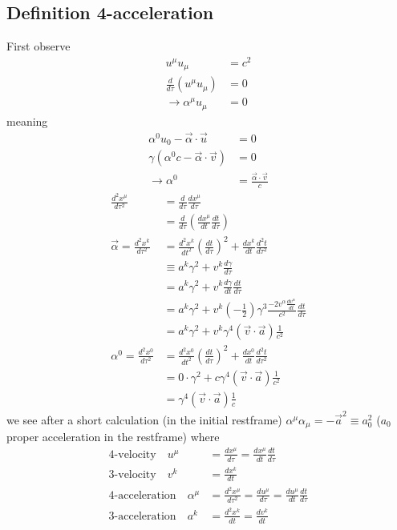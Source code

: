\documentclass[10pt,a4paper]{book}
\theoremstyle{definition}
\begin{document}
\subsection{Definition 4-acceleration}
First observe
\begin{align}
u^\mu u_\mu&=c^2\\
\frac{d}{d\tau}(u^\mu u_\mu)&=0\\
\rightarrow \alpha^\mu u_\mu&=0
\end{align}
meaning
\begin{align}
\alpha^0 u_0-\vec{\alpha}\cdot\vec{u}&=0\\
\gamma(\alpha^0 c-\vec{\alpha}\cdot\vec{v})&=0\\
\rightarrow \alpha^0&=\frac{\vec{\alpha}\cdot\vec{v}}{c}
\end{align}
\begin{align}
\frac{d^2x^\mu}{d\tau^2}
&=\frac{d}{d\tau}\frac{dx^\mu}{d\tau}\\
&=\frac{d}{d\tau}\left(\frac{dx^\mu}{dt}\frac{dt}{d\tau}\right)\\
\vec{\alpha}=
\frac{d^2x^k}{d\tau^2}&=\frac{d^2x^k}{dt^2}\left(\frac{dt}{d\tau}\right)^2+\frac{dx^k}{dt}\frac{d^2t}{d\tau^2}\\
&\equiv a^k\gamma^2+v^k\frac{d\gamma}{d\tau}\\
&=a^k\gamma^2+v^k\frac{d\gamma}{dt}\frac{dt}{d\tau}\\
&=a^k\gamma^2+v^k\left(-\frac{1}{2}\right)\gamma^3\frac{-2v^\alpha\frac{dv^\alpha}{dt}}{c^2} \frac{dt}{d\tau}\\
&=a^k\gamma^2+v^k\gamma^4(\vec{v}\cdot\vec{a})\frac{1}{c^2}\\
\alpha^0=
\frac{d^2x^0}{d\tau^2}
&=\frac{d^2x^0}{dt^2}\left(\frac{dt}{d\tau}\right)^2+\frac{dx^0}{dt}\frac{d^2t}{d\tau^2}\\
&=0\cdot\gamma^2+c\gamma^4(\vec{v}\cdot\vec{a})\frac{1}{c^2}\\
&=\gamma^4(\vec{v}\cdot\vec{a})\frac{1}{c}
\end{align}
we see after a short calculation (in the initial restframe) $\alpha^\mu\alpha_\mu=-\vec{a}^2\equiv a^2_0$ ($a_0$ proper acceleration in the restframe)  where
\begin{align}
\text{4-velocity}\quad u^\mu&=\frac{dx^\mu}{d\tau}=\frac{dx^\mu}{dt}\frac{dt}{d\tau}\\
\text{3-velocity}\quad v^k&=\frac{dx^k}{dt}\\
\text{4-acceleration}\quad \alpha^\mu&=\frac{d^2x^\mu}{d\tau^2}=\frac{du^\mu}{d\tau}=\frac{du^\mu}{dt}\frac{dt}{d\tau}\\
\text{3-acceleration}\quad a^k&=\frac{d^2x^k}{dt}=\frac{dv^k}{dt}
\end{align}
\end{document}
